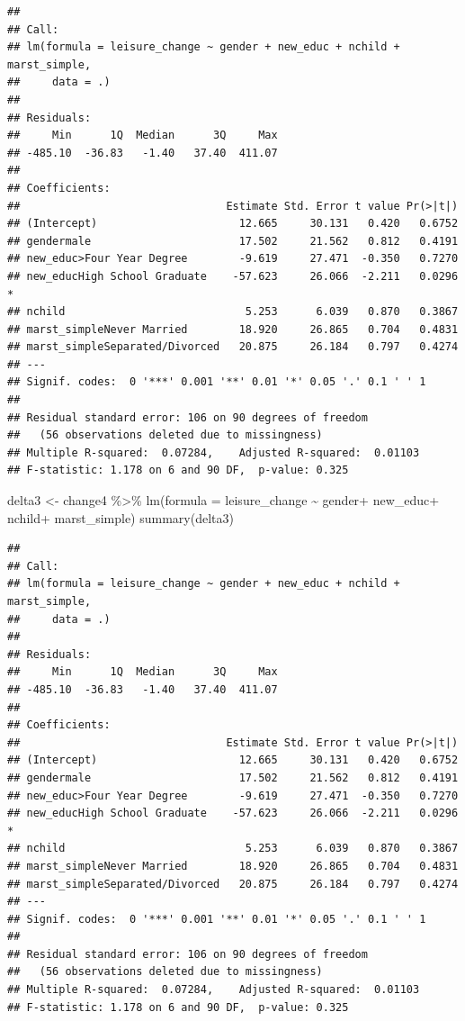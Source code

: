 \documentclass[
]{article}
\newenvironment{Shaded}{\begin{snugshade}}{\end{snugshade}}
\newcommand{\AttributeTok}[1]{\textcolor[rgb]{0.77,0.63,0.00}{#1}}
\newcommand{\FunctionTok}[1]{\textcolor[rgb]{0.00,0.00,0.00}{#1}}
\newcommand{\NormalTok}[1]{#1}
\newcommand{\OtherTok}[1]{\textcolor[rgb]{0.56,0.35,0.01}{#1}}
\newcommand{\SpecialCharTok}[1]{\textcolor[rgb]{0.00,0.00,0.00}{#1}}
\begin{document}
\begin{verbatim}
## 
## Call:
## lm(formula = leisure_change ~ gender + new_educ + nchild + marst_simple, 
##     data = .)
## 
## Residuals:
##     Min      1Q  Median      3Q     Max 
## -485.10  -36.83   -1.40   37.40  411.07 
## 
## Coefficients:
##                                Estimate Std. Error t value Pr(>|t|)  
## (Intercept)                      12.665     30.131   0.420   0.6752  
## gendermale                       17.502     21.562   0.812   0.4191  
## new_educ>Four Year Degree        -9.619     27.471  -0.350   0.7270  
## new_educHigh School Graduate    -57.623     26.066  -2.211   0.0296 *
## nchild                            5.253      6.039   0.870   0.3867  
## marst_simpleNever Married        18.920     26.865   0.704   0.4831  
## marst_simpleSeparated/Divorced   20.875     26.184   0.797   0.4274  
## ---
## Signif. codes:  0 '***' 0.001 '**' 0.01 '*' 0.05 '.' 0.1 ' ' 1
## 
## Residual standard error: 106 on 90 degrees of freedom
##   (56 observations deleted due to missingness)
## Multiple R-squared:  0.07284,    Adjusted R-squared:  0.01103 
## F-statistic: 1.178 on 6 and 90 DF,  p-value: 0.325
\end{verbatim}

\begin{Shaded}
\begin{Highlighting}[]
\NormalTok{delta3 }\OtherTok{\textless{}{-}}\NormalTok{ change4 }\SpecialCharTok{\%\textgreater{}\%}
  \FunctionTok{lm}\NormalTok{(}\AttributeTok{formula =}\NormalTok{ leisure\_change }\SpecialCharTok{\textasciitilde{}}\NormalTok{ gender}\SpecialCharTok{+}\NormalTok{ new\_educ}\SpecialCharTok{+}\NormalTok{ nchild}\SpecialCharTok{+}\NormalTok{ marst\_simple)}
\FunctionTok{summary}\NormalTok{(delta3)}
\end{Highlighting}
\end{Shaded}

\begin{verbatim}
## 
## Call:
## lm(formula = leisure_change ~ gender + new_educ + nchild + marst_simple, 
##     data = .)
## 
## Residuals:
##     Min      1Q  Median      3Q     Max 
## -485.10  -36.83   -1.40   37.40  411.07 
## 
## Coefficients:
##                                Estimate Std. Error t value Pr(>|t|)  
## (Intercept)                      12.665     30.131   0.420   0.6752  
## gendermale                       17.502     21.562   0.812   0.4191  
## new_educ>Four Year Degree        -9.619     27.471  -0.350   0.7270  
## new_educHigh School Graduate    -57.623     26.066  -2.211   0.0296 *
## nchild                            5.253      6.039   0.870   0.3867  
## marst_simpleNever Married        18.920     26.865   0.704   0.4831  
## marst_simpleSeparated/Divorced   20.875     26.184   0.797   0.4274  
## ---
## Signif. codes:  0 '***' 0.001 '**' 0.01 '*' 0.05 '.' 0.1 ' ' 1
## 
## Residual standard error: 106 on 90 degrees of freedom
##   (56 observations deleted due to missingness)
## Multiple R-squared:  0.07284,    Adjusted R-squared:  0.01103 
## F-statistic: 1.178 on 6 and 90 DF,  p-value: 0.325
\end{verbatim}
\end{document}
